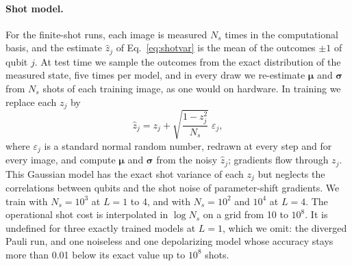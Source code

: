 \documentclass[
 aps,pra,
 twocolumn,
 superscriptaddress,
 longbibliography,
 nofootinbib
]{revtex4-2}
\begin{document}
\paragraph{Shot model.}
For the finite-shot runs, each image is measured $N_s$ times in the
computational basis, and the estimate $\hat z_j$ of Eq.~\eqref{eq:shotvar} is the
mean of the outcomes $\pm1$ of qubit $j$. At test time we sample the outcomes from the exact distribution of
the measured state, five times per model, and in every draw we re-estimate
$\boldsymbol\mu$ and $\boldsymbol\sigma$ from $N_s$ shots of each training
image, as one would on hardware. In training we replace each $z_j$ by
\begin{equation}
\hat z_j=z_j+\sqrt{\frac{1-z_j^2}{N_s}}\;\varepsilon_j ,
\label{eq:shot_train}
\end{equation}
where $\varepsilon_j$ is a standard normal random number, redrawn at every step
and for every image, and compute $\boldsymbol\mu$ and
$\boldsymbol\sigma$ from the noisy $\hat z_j$; gradients flow through $z_j$. This
Gaussian model has the exact shot variance of each $z_j$ but neglects the
correlations between qubits and the shot noise of parameter-shift gradients. We train with
$N_s=10^3$ at $L=1$ to 4, and with $N_s=10^2$ and $10^4$ at $L=4$. The
operational shot cost is interpolated in $\log N_s$ on a grid from 10 to
$10^8$. It is undefined for three exactly trained models at $L=1$, which we
omit: the diverged Pauli run, and one noiseless and one depolarizing model
whose accuracy stays more than 0.01 below its exact value up to $10^8$ shots.


\end{document}
